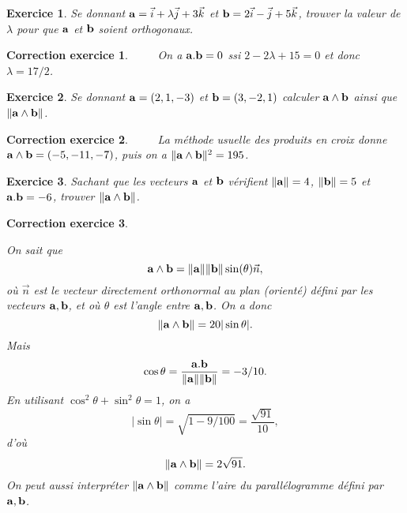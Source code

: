 \documentclass[12pt]{article}
\newtheorem{exercice}{\bf Exercice}
\newtheorem{correction}{\bf Correction exercice}
\newenvironment{exo}{
\begin{exercice}\smallskip\normalfont}{\end{exercice}
}
\newenvironment{cor}{
\begin{correction}\smallskip\normalfont}{\end{correction}
}
\newcommand{\I}{{ \vec{i}}}
\newcommand{\J}{{ \vec{j}}}
\newcommand{\K}{{ \vec{k}}}
\newif\ifcorrige\corrigetrue
\begin{document}
\begin{exo} Se donnant ${\bf a}=\I+\lambda \J+3\K$ et ${\bf b}=2\I-\J+5\K$, trouver la valeur de $\lambda$ pour que ${\bf a}$ et $\bf b$ soient orthogonaux.
\end{exo}
\ifcorrige
\color{magenta}
\begin{cor}
  $\qquad$ 
  On a ${\bf a}.{\bf b}=0$ ssi $2-2\lambda+15=0$ et donc $\lambda=17/2$.
\end{cor}
\color{black}
\fi
\begin{exo} Se donnant ${\bf a}=(2,1,-3)$ et ${\bf b}=(3,-2,1)$ calculer ${\bf a}\wedge {\bf b}$ ainsi que $\Vert {\bf a}\wedge {\bf b} \Vert$.
\end{exo}
\ifcorrige
\color{magenta}
\begin{cor}
  $\qquad$ 
  La m\'ethode usuelle des produits en croix donne ${\bf a}\wedge {\bf b}=(-5,-11,-7)$, puis on a 
  $ \Vert {\bf a}\wedge {\bf b} \Vert^2=195$.
\end{cor}
\color{black}
\fi

\begin{exo}
Sachant que les vecteurs $\bf a$ et $\bf b$ v\'erifient $\Vert {\bf a}\Vert=4$, $\Vert {\bf b}\Vert=5$ et ${\bf a}.{\bf b}=-6$, trouver $\Vert {\bf a}\wedge {\bf b} \Vert$.
\end{exo}
\ifcorrige
\color{magenta}
\begin{cor}
  $\qquad$ 
  
  On sait que $${\bf a}\wedge {\bf b}=\Vert {\bf a }\Vert \Vert {\bf b }\Vert \sin(\theta) \vec{n},$$
  o\`u $\vec{n}$ est le vecteur directement orthonormal au plan (orient\'e) d\'efini par les vecteurs ${\bf a},{\bf b}$, et o\`u $\theta$ est l'angle entre ${\bf a},{\bf b}$.
  On a donc
  $$\Vert  {\bf a}\wedge {\bf b} \Vert= 20 \vert \sin \theta \vert.$$
  Mais 
  $$\cos\theta =\frac{{\bf a }.{\bf b}}{ \Vert {\bf a} \Vert \Vert {\bf b} \Vert}=-3/10.$$
  En utilisant $\cos^2 \theta+\sin^2\theta=1$, on a
  $$ \vert \sin \theta \vert=\sqrt{1-9/100}=\frac{\sqrt{91}}{10},$$
  d'o\`u
  $$ \Vert  {\bf a}\wedge {\bf b} \Vert=2\sqrt{91}.$$
  On peut aussi interpr\'eter $  \Vert  {\bf a}\wedge {\bf b} \Vert$ comme l'aire du parall\'elogramme d\'efini par ${\bf a},{\bf b}$.
\end{cor}
\color{black}
\fi
\end{document}
